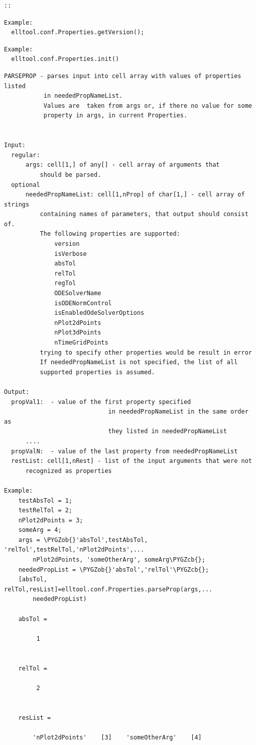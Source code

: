 \documentclass[letterpaper,10pt,english]{sphinxmanual}
\def\PYGZob{\char`\{}
\def\PYGZcb{\char`\}}
\begin{document}
\begin{Verbatim}[commandchars=\\\{\}]
::
\end{Verbatim}

\begin{Verbatim}[commandchars=\\\{\}]
Example:
  elltool.conf.Properties.getVersion();
\end{Verbatim}

\begin{Verbatim}[commandchars=\\\{\}]
Example:
  elltool.conf.Properties.init()
\end{Verbatim}

\begin{Verbatim}[commandchars=\\\{\}]
PARSEPROP - parses input into cell array with values of properties listed
           in neededPropNameList.
           Values are  taken from args or, if there no value for some
           property in args, in current Properties.


Input:
  regular:
      args: cell[1,] of any[] - cell array of arguments that
          should be parsed.
  optional
      neededPropNameList: cell[1,nProp] of char[1,] - cell array of strings
          containing names of parameters, that output should consist of.
          The following properties are supported:
              version
              isVerbose
              absTol
              relTol
              regTol
              ODESolverName
              isODENormControl
              isEnabledOdeSolverOptions
              nPlot2dPoints
              nPlot3dPoints
              nTimeGridPoints
          trying to specify other properties would be result in error
          If neededPropNameList is not specified, the list of all
          supported properties is assumed.

Output:
  propVal1:  - value of the first property specified
                             in neededPropNameList in the same order as
                             they listed in neededPropNameList
      ....
  propValN:  - value of the last property from neededPropNameList
  restList: cell[1,nRest] - list of the input arguments that were not
      recognized as properties

Example:
    testAbsTol = 1;
    testRelTol = 2;
    nPlot2dPoints = 3;
    someArg = 4;
    args = \PYGZob{}'absTol',testAbsTol, 'relTol',testRelTol,'nPlot2dPoints',...
        nPlot2dPoints, 'someOtherArg', someArg\PYGZcb{};
    neededPropList = \PYGZob{}'absTol','relTol'\PYGZcb{};
    [absTol, relTol,resList]=elltool.conf.Properties.parseProp(args,...
        neededPropList)

    absTol =

         1


    relTol =

         2


    resList =

        'nPlot2dPoints'    [3]    'someOtherArg'    [4]
\end{Verbatim}
\end{document}
